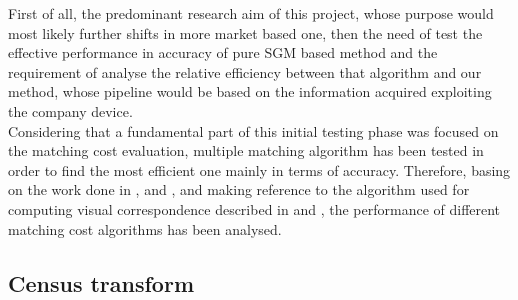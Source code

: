 First of all, the predominant research aim of this project, whose purpose would most likely further shifts in more market based one, then the need of test the effective performance in accuracy of pure SGM based method and the requirement of analyse the relative efficiency between that algorithm and our method, whose pipeline would be based on the information acquired exploiting the company device. \\
Considering that a fundamental part of this initial testing phase was focused on the matching cost evaluation, multiple matching algorithm has been tested in order to find the most efficient one mainly in terms of accuracy. 
Therefore, basing on the work done in \cite{Hirschmuller2007}, \cite{Patil2013} and \cite{Ko2017}, and making reference to the algorithm used for computing visual correspondence described in \cite{Zabih1994} and \cite{Demetz2013}, the performance of different matching cost algorithms has been analysed.\\

\subsection{Census transform}
\label{subsection:census-transform}

